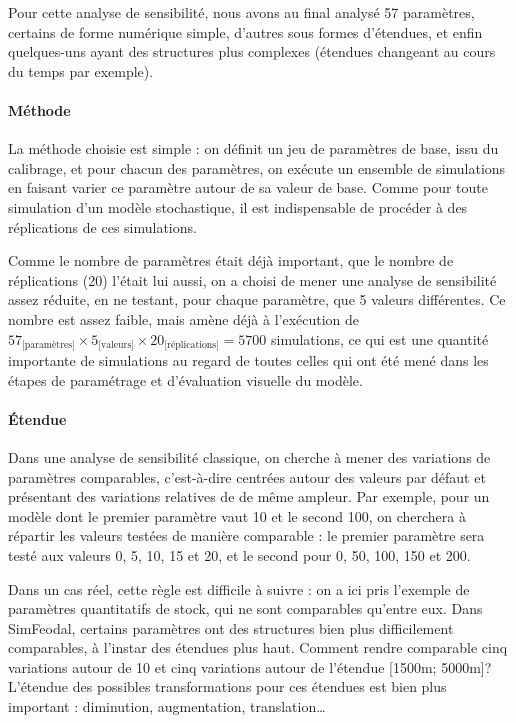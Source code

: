 Pour cette analyse de sensibilité, nous avons au final analysé 57 \og paramètres\fg{}, certains de forme numérique simple, d'autres sous formes d'étendues, et enfin quelques-uns ayant des structures plus complexes (étendues changeant au cours du temps par exemple).

\paragraph{Méthode}

La méthode choisie est simple : on définit un jeu de paramètres de base, issu du calibrage, et pour chacun des paramètres, on exécute un ensemble de simulations en faisant varier ce paramètre autour de sa valeur de base.
Comme pour toute simulation d'un modèle stochastique, il est indispensable de procéder à des réplications de ces simulations.

Comme le nombre de paramètres était déjà important, que le nombre de réplications (20) l'était lui aussi, on a choisi de mener une analyse de sensibilité assez réduite, en ne testant, pour chaque paramètre, que 5 valeurs différentes.
Ce nombre est assez faible, mais amène déjà à l'exécution de $57_{\text{[paramètres]}} \times 5_{\text{[valeurs]}} \times 20_{\text{[réplications]}} = 5700$ simulations, ce qui est une quantité importante de simulations au regard de toutes celles qui ont été mené dans les étapes de paramétrage et d'évaluation visuelle du modèle.

\paragraph{Étendue}
\label{par:etendue-parametres}

Dans une analyse de sensibilité classique, on cherche à mener des variations de paramètres comparables, c'est-à-dire centrées autour des valeurs par défaut et présentant des variations relatives de de même ampleur.
Par exemple, pour un modèle dont le premier paramètre vaut 10 et le second 100, on cherchera à répartir les valeurs testées de manière comparable : 
le premier paramètre sera testé aux valeurs 0, 5, 10, 15 et 20, et le second pour 0, 50, 100, 150 et 200.

Dans un cas réel, cette règle est difficile à suivre : on a ici pris l'exemple de paramètres quantitatifs \og de stock\fg{}, qui ne sont comparables qu'entre eux.
Dans SimFeodal, certains paramètres ont des structures bien plus difficilement comparables, à l'instar des étendues plus haut.
Comment rendre comparable cinq variations autour de 10 et cinq variations autour de l'étendue [1500m; 5000m]?
L'étendue des possibles transformations pour ces étendues est bien plus important : diminution, augmentation, translation\ldots

